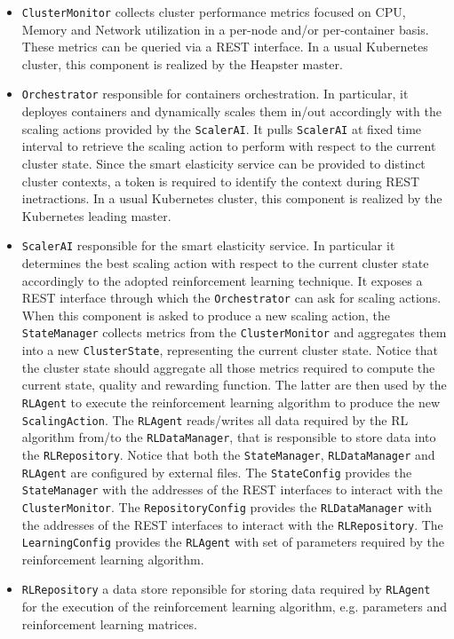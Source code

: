 \begin{itemize}
	
	\item \texttt{ClusterMonitor} collects cluster performance metrics focused on CPU, Memory and Network utilization in a per-node and/or per-container basis. 
	These metrics can be queried via a REST interface.
	In a usual Kubernetes cluster, this component is realized by the Heapster master.
	
	\item \texttt{Orchestrator} responsible for containers orchestration. 
	In particular, it deployes containers and dynamically scales them in/out accordingly with the scaling actions provided by the \texttt{ScalerAI}.
	It pulls \texttt{ScalerAI} at fixed time interval to retrieve the scaling action to perform with respect to the current cluster state. 
	Since the smart elasticity service can be provided to distinct cluster contexts, a token is required to identify the context during REST inetractions.
	In a usual Kubernetes cluster, this component is realized by the Kubernetes leading master.
	
	\item \texttt{ScalerAI} responsible for the smart elasticity service.
	In particular it determines the best scaling action with respect to the current cluster state accordingly to the adopted reinforcement learning technique. 
	It exposes a REST interface through which the \texttt{Orchestrator} can ask for scaling actions.
	When this component is asked to produce a new scaling action, the \texttt{StateManager} collects metrics from the \texttt{ClusterMonitor} and aggregates them into a new \texttt{ClusterState}, representing the current cluster state.
	Notice that the cluster state should aggregate all those metrics required to compute the current state, quality and rewarding function.
	The latter are then used by the \texttt{RLAgent} to execute the reinforcement learning algorithm to produce the new \texttt{ScalingAction}.
	The \texttt{RLAgent} reads/writes all data required by the RL algorithm from/to the \texttt{RLDataManager}, that is responsible to store data into the \texttt{RLRepository}.
	Notice that both the \texttt{StateManager}, \texttt{RLDataManager} and \texttt{RLAgent} are configured by external files.
	The \texttt{StateConfig} provides the \texttt{StateManager} with the addresses of the REST interfaces to interact with the \texttt{ClusterMonitor}.
	The \texttt{RepositoryConfig} provides the \texttt{RLDataManager} with the addresses of the REST interfaces to interact with the \texttt{RLRepository}.
	The \texttt{LearningConfig} provides the \texttt{RLAgent} with set of parameters required by the reinforcement learning algorithm.
	
	\item \texttt{RLRepository} a data store reponsible for storing data required by \texttt{RLAgent} for the execution of the reinforcement learning algorithm, e.g. parameters and reinforcement learning matrices.
	
\end{itemize}

